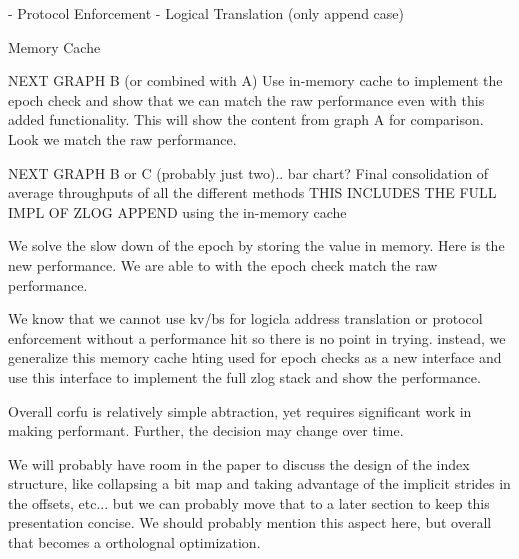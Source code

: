 \documentclass[10pt,twocolumn]{article}
\begin{document}
- Protocol Enforcement
- Logical Translation (only append case)

Memory Cache

NEXT GRAPH B (or combined with A)
Use in-memory cache to implement the epoch check and show that we can match
the raw performance even with this added functionality.
This will show the content from graph A for comparison. Look
we match the raw performance.

NEXT GRAPH B or C (probably just two).. bar chart?
 Final consolidation of average throughputs of all the different
methods
 THIS INCLUDES THE FULL IMPL OF ZLOG APPEND using the in-memory cache

We solve the slow down of the epoch by storing the value in memory. Here is
the new performance.  We are able to with the epoch check match the raw
performance.

We know that we cannot use kv/bs for logicla address translation or protocol
enforcement without a performance hit so there is no point in trying. instead,
we generalize this memory cache hting used for epoch checks as a
new interface and use this interface to implement the full zlog
stack and show the performance.

Overall corfu is relatively simple abtraction, yet requires significant
work in making performant. Further, the decision may change over time.

We will probably have room in the paper to discuss the design of the
index structure, like collapsing a bit map and taking advantage of
the implicit strides in the offsets, etc... but we can probably move
that to a later section to keep this presentation concise. We should
probably mention this aspect here, but overall that becomes a ortholognal
optimization.


\end{document}
